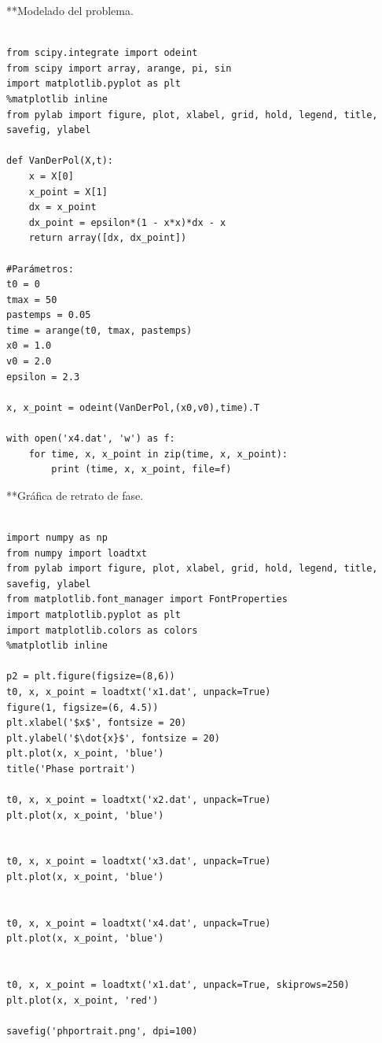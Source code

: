 \documentclass{article} %
\begin{document}
**Modelado del problema. 

\begin{verbatim} 

from scipy.integrate import odeint 
from scipy import array, arange, pi, sin
import matplotlib.pyplot as plt
%matplotlib inline
from pylab import figure, plot, xlabel, grid, hold, legend, title, savefig, ylabel

def VanDerPol(X,t):
    x = X[0]
    x_point = X[1]
    dx = x_point
    dx_point = epsilon*(1 - x*x)*dx - x
    return array([dx, dx_point])

#Parámetros: 
t0 = 0
tmax = 50
pastemps = 0.05
time = arange(t0, tmax, pastemps)
x0 = 1.0
v0 = 2.0
epsilon = 2.3

x, x_point = odeint(VanDerPol,(x0,v0),time).T

with open('x4.dat', 'w') as f:
    for time, x, x_point in zip(time, x, x_point):
        print (time, x, x_point, file=f)

\end{verbatim}

**Gráfica de retrato de fase. 

\begin{verbatim} 

import numpy as np
from numpy import loadtxt
from pylab import figure, plot, xlabel, grid, hold, legend, title, savefig, ylabel
from matplotlib.font_manager import FontProperties
import matplotlib.pyplot as plt
import matplotlib.colors as colors
%matplotlib inline

p2 = plt.figure(figsize=(8,6))
t0, x, x_point = loadtxt('x1.dat', unpack=True)
figure(1, figsize=(6, 4.5))
plt.xlabel('$x$', fontsize = 20)
plt.ylabel('$\dot{x}$', fontsize = 20)
plt.plot(x, x_point, 'blue')
title('Phase portrait')

t0, x, x_point = loadtxt('x2.dat', unpack=True)
plt.plot(x, x_point, 'blue')


t0, x, x_point = loadtxt('x3.dat', unpack=True)
plt.plot(x, x_point, 'blue')


t0, x, x_point = loadtxt('x4.dat', unpack=True)
plt.plot(x, x_point, 'blue')


t0, x, x_point = loadtxt('x1.dat', unpack=True, skiprows=250)
plt.plot(x, x_point, 'red')

savefig('phportrait.png', dpi=100)

\end{verbatim}
\end{document}
